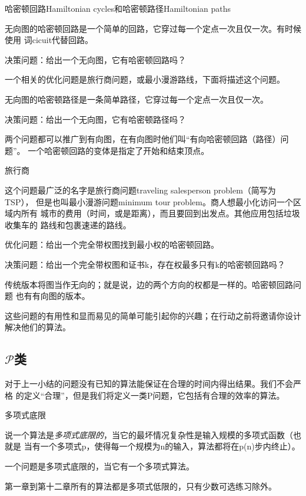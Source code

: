 \begin{problem}
哈密顿回路Hamiltonian cycles和哈密顿路径Hamiltonian paths

无向图的哈密顿回路是一个简单的回路，它穿过每一个定点一次且仅一次。有时候使用
词cicuit代替回路。

决策问题：给出一个无向图，它有哈密顿回路吗？

一个相关的优化问题是旅行商问题，或最小漫游路线，下面将描述这个问题。

无向图的哈密顿路径是一条简单路径，它穿过每一个定点一次且仅一次。

决策问题：给出一个无向图，它有哈密顿路径吗？

两个问题都可以推广到有向图，在有向图时他们叫“有向哈密顿回路（路径）问题”。
一个哈密顿回路的变体是指定了开始和结束顶点。
\end{problem}

\begin{problem}
旅行商

这个问题最广泛的名字是旅行商问题traveling salesperson problem（简写为TSP），
但是也叫最小漫游问题minimum tour problem。商人想最小化访问一个区域内所有
城市的费用（时间，或是距离），而且要回到出发点。其他应用包括垃圾收集车的
路线和包裹速递的路线。

优化问题：给出一个完全带权图找到最小权的哈密顿回路。

决策问题：给出一个完全带权图和证书k，存在权最多只有k的哈密顿回路吗？

传统版本将图当作无向的；就是说，边的两个方向的权都是一样的。哈密顿回路问题
也有有向图的版本。
\end{problem}

这些问题的有用性和显而易见的简单可能引起你的兴趣；在行动之前将邀请你设计解决他们的算法。

\subsection{$\mathcal {P}$类}
对于上一小结的问题没有已知的算法能保证在合理的时间内得出结果。我们不会严格
的定义“合理”，但是我们将定义一类P问题，它包括有合理的效率的算法。

\begin{definition}
多项式底限

说一个算法是\emph{多项式底限的}，当它的最坏情况复杂性是输入规模的多项式函数（也就是
当有一个多项式p，使得每一个规模为n的输入，算法都将在p(n)步内终止）。

一个问题是多项式底限的，当它有一个多项式算法。
\end{definition}
第一章到第十二章所有的算法都是多项式低限的，只有少数可选练习除外。

